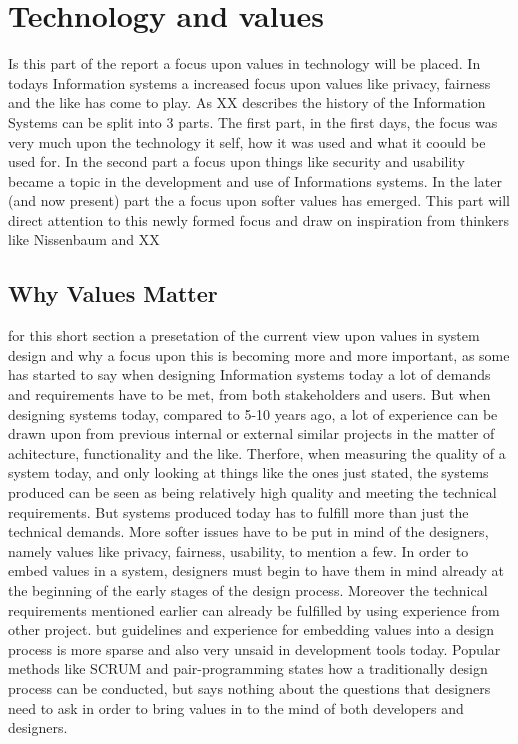 
\section{Technology and values}
Is this part of the report a focus upon values in technology will be placed. In todays Information systems a increased focus upon values like privacy, fairness and the like has come to play. As XX describes the history of the Information Systems can be split into 3 parts. The first part, in the first days, the focus was very much upon the technology it self, how it was used and what it coould be used for. In the second part a focus upon things like security and usability became a topic in the development and use of Informations systems. In the later (and now present) part the a focus upon softer values has emerged. This part will direct attention to this newly formed focus and draw on inspiration from thinkers like Nissenbaum and XX 

\subsection{Why Values Matter}
for this short section a presetation of the current view upon values in system design and why a focus upon this is becoming more and more important, as some has started to say
when designing Information systems today a lot of demands and requirements have to be met, from both stakeholders and users. But when designing systems today, compared to 5-10 years ago, a lot of experience can be drawn upon from previous internal or external similar projects in the matter of achitecture, functionality and the like. Therfore, when measuring the quality of a system today, and only looking at things like the ones just stated, the systems produced can be seen as being relatively high quality and meeting the technical requirements. But systems produced today has to fulfill more than just the technical demands. More softer issues have to be put in mind of the designers, namely values like privacy, fairness, usability, to mention a few. In order to embed values in a system, designers must begin to have them in mind already at the beginning of the early stages of the design process. Moreover the technical requirements mentioned earlier can already be fulfilled by using experience from other project. but guidelines and experience for embedding values into a design process is more sparse and also very unsaid in development tools today. Popular methods like SCRUM and pair-programming states how a traditionally design process can be conducted, but says nothing about the questions that designers need to ask in order to bring values in to the mind of both developers and designers. 

